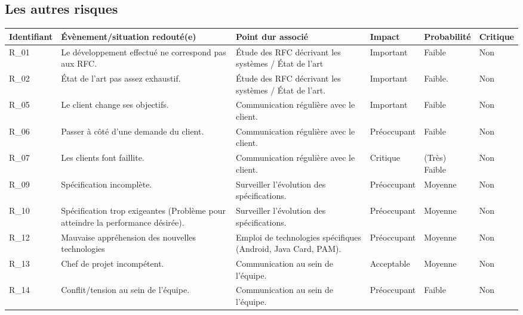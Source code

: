 \documentclass{../../res/univ-projet}
\begin{document}
\subsection{Les autres risques}
\begin{flushleft}
	\begin{tabular}{| p{1.4cm} | p{4cm} | p{4cm} | p{1.7cm} | p{1.6cm} | p{1.2cm} |}
  		\hline
  		\cellcolor{gray}Identifiant & \cellcolor{lightgray}Évènement/situation redouté(e) & \cellcolor{lightgray}Point dur associé & \cellcolor{lightgray}Impact & \cellcolor{lightgray}Probabilité & \cellcolor{lightgray}Critique \\ \hline
  
  		R\_01 & Le développement effectué ne correspond pas aux RFC. & Étude des RFC décrivant les systèmes / État de l'art & Important & Faible & \cellcolor{green} Non \\ \hline
  		R\_02 & État de l'art pas assez exhaustif. & Étude des RFC décrivant les systèmes / État de l'art. & Important & Faible. & \cellcolor{green} Non \\ \hline
  		R\_05 & Le client change ses objectifs. & Communication régulière avec le client. & Important & Faible & \cellcolor{green} Non\\ \hline
  		R\_06 & Passer à côté d'une demande du client. & Communication régulière avec le client. & Préoccupant & Faible & \cellcolor{green} Non \\ \hline
  		R\_07 & Les clients font faillite. & Communication régulière avec le client. & Critique & (Très) Faible & \cellcolor{green} Non\\ \hline
  		R\_09 & Spécification incomplète. & Surveiller l'évolution des spécifications. & Préoccupant & Moyenne & \cellcolor{green} Non\\ \hline
  		R\_10 & Spécification trop exigeantes (Problème pour atteindre la performance désirée). & Surveiller l'évolution des spécifications. & Préoccupant & Moyenne & \cellcolor{green} Non\\ \hline
  		R\_12 & Mauvaise appréhension des nouvelles technologies & Emploi de technologies spécifiques (Android, Java Card, PAM). & Préoccupant & Moyenne & \cellcolor{green} Non \\ \hline
  		R\_13 & Chef de projet incompétent. & Communication au sein de l'équipe. & Acceptable & Moyenne & \cellcolor{green} Non\\ \hline
  		R\_14 & Conflit/tension au sein de l'équipe. & Communication au sein de l'équipe. & Préoccupant & Faible & \cellcolor{green} Non\\ \hline

\end{tabular}
\end{flushleft}
\end{document}

